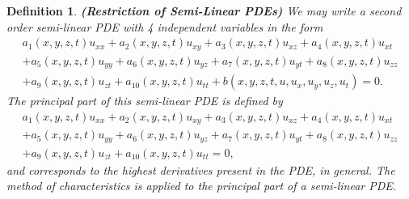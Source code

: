 \documentclass[12pt]{article}
\newtheorem{definition}{Definition}[section]
\theoremstyle{definition}
\numberwithin{equation}{section}
\begin{document}
\begin{definition}\textbf{(Restriction of Semi-Linear PDEs)}
We may write a second order semi-linear PDE with 4 independent variables in the form
\begin{multline}a_1(x,y,z,t)u_{xx}+a_2(x,y,z,t)u_{xy}+a_3(x,y,z,t)u_{xz}+a_4(x,y,z,t)u_{xt}\\+a_5(x,y,z,t)u_{yy}+a_6(x,y,z,t)u_{yz}+a_7(x,y,z,t)u_{yt}+a_8(x,y,z,t)u_{zz}\\+a_9(x,y,z,t)u_{zt}+a_{10}(x,y,z,t)u_{tt}+ b(x,y,z,t,u,u_x,u_y,u_z,u_t)=0.\nonumber
\end{multline}
The principal part of this semi-linear PDE is defined by
\begin{multline}a_1(x,y,z,t)u_{xx}+a_2(x,y,z,t)u_{xy}+a_3(x,y,z,t)u_{xz}+a_4(x,y,z,t)u_{xt}\\+a_5(x,y,z,t)u_{yy}+a_6(x,y,z,t)u_{yz}+a_7(x,y,z,t)u_{yt}+a_8(x,y,z,t)u_{zz}\\+a_9(x,y,z,t)u_{zt}+a_{10}(x,y,z,t)u_{tt}=0,\label{principal.eqn}
\end{multline}
and corresponds to the highest derivatives present in the PDE, in general. The method of characteristics is applied to the principal part of a semi-linear PDE.
\end{definition}
\end{document}
